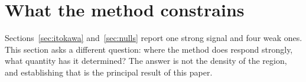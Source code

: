 %
%
%
%

\section{What the method constrains}
\label{sec:constrains}

Sections~\ref{sec:itokawa} and~\ref{sec:nulls} report one strong signal and
four weak ones. This section asks a different question: where the method
does respond strongly, what quantity has it determined? The answer is not
the density of the region, and establishing that is the principal result of
this paper.

